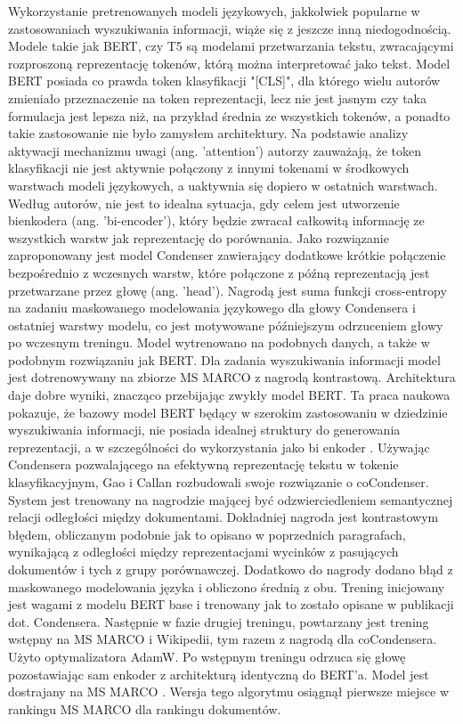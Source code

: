 Wykorzystanie pretrenowanych modeli językowych, jakkolwiek popularne w zastosowaniach
wyszukiwania informacji, wiąże się z jeszcze inną niedogodnością. Modele takie jak BERT, czy T5 są
modelami przetwarzania tekstu, zwracającymi rozproszoną reprezentację tokenów, którą można
interpretować jako tekst. Model BERT posiada co prawda token klasyfikacji "[CLS]", dla którego wielu
autorów zmieniało przeznaczenie na token reprezentacji, lecz nie jest jasnym czy taka formulacja jest
lepsza niż, na przykład średnia ze wszystkich tokenów, a ponadto takie zastosowanie nie było
zamysłem architektury. Na podstawie analizy aktywacji mechanizmu uwagi (ang. 'attention') autorzy
zauważają, że token klasyfikacji nie jest aktywnie połączony z innymi tokenami w środkowych
warstwach modeli językowych, a uaktywnia się dopiero w ostatnich warstwach. Według autorów, nie
jest to idealna sytuacja, gdy celem jest utworzenie bienkodera (ang. 'bi-encoder'), który będzie
zwracał całkowitą informację ze wszystkich warstw jak reprezentację do porównania. Jako rozwiązanie
zaproponowany jest model Condenser zawierający dodatkowe krótkie połączenie bezpośrednio z wczesnych warstw, które połączone z późną reprezentacją jest przetwarzane przez głowę (ang.
'head'). Nagrodą jest suma funkcji cross-entropy na zadaniu maskowanego modelowania językowego
dla głowy Condensera i ostatniej warstwy modelu, co jest motywowane późniejszym odrzuceniem
głowy po wczesnym treningu. Model wytrenowano na podobnych danych, a także w podobnym
rozwiązaniu jak BERT. Dla zadania wyszukiwania informacji model jest dotrenowywany na zbiorze MS
MARCO z nagrodą kontrastową. Architektura daje dobre wyniki, znacząco przebijając zwykły model
BERT. Ta praca naukowa pokazuje, że bazowy model BERT będący w szerokim zastosowaniu w
dziedzinie wyszukiwania informacji, nie posiada idealnej struktury do generowania reprezentacji, a w
szczególności do wykorzystania jako bi enkoder \autocite{gao2021condenser}.
Używając Condensera pozwalającego na efektywną reprezentację tekstu w tokenie
klasyfikacyjnym, Gao i Callan rozbudowali swoje rozwiązanie o coCondenser. System jest trenowany
na nagrodzie mającej być odzwierciedleniem semantycznej relacji odległości między dokumentami.
Dokładniej nagroda jest kontrastowym błędem, obliczanym podobnie jak to opisano w poprzednich
paragrafach, wynikającą z odległości między reprezentacjami wycinków z pasujących dokumentów i
tych z grupy porównawczej. Dodatkowo do nagrody dodano błąd z maskowanego modelowania języka i obliczono średnią z obu. Trening inicjowany jest wagami z modelu BERT base i trenowany jak to
zostało opisane w publikacji dot. Condensera. Następnie w fazie drugiej treningu, powtarzany jest
trening wstępny na MS MARCO i Wikipedii, tym razem z nagrodą dla coCondensera. Użyto
optymalizatora AdamW. Po wstępnym treningu odrzuca się głowę pozostawiając sam enkoder z
architekturą identyczną do BERT'a. Model jest dostrajany na MS MARCO \autocite{gao2021unsupervised}. Wersja tego algorytmu
osiągnął pierwsze miejsce w rankingu MS MARCO dla rankingu dokumentów.


